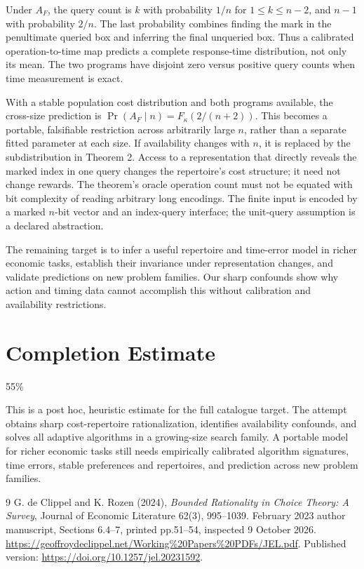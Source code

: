 \documentclass[11pt]{article}
\theoremstyle{remark}
\begin{document}
Under $A_F$, the query count is $k$ with probability $1/n$ for $1\leq k\leq n-2$, and $n-1$ with probability $2/n$. The last probability combines finding the mark in the penultimate queried box and inferring the final unqueried box. Thus a calibrated operation-to-time map predicts a complete response-time distribution, not only its mean. The two programs have disjoint zero versus positive query counts when time measurement is exact.

With a stable population cost distribution and both programs available, the cross-size prediction is $\Pr(A_F\mid n)=F_\kappa(2/(n+2))$. This becomes a portable, falsifiable restriction across arbitrarily large $n$, rather than a separate fitted parameter at each size. If availability changes with $n$, it is replaced by the subdistribution in Theorem 2. Access to a representation that directly reveals the marked index in one query changes the repertoire's cost structure; it need not change rewards. The theorem's oracle operation count must not be equated with bit complexity of reading arbitrary long encodings. The finite input is encoded by a marked $n$-bit vector and an index-query interface; the unit-query assumption is a declared abstraction.

The remaining target is to infer a useful repertoire and time-error model in richer economic tasks, establish their invariance under representation changes, and validate predictions on new problem families. Our sharp confounds show why action and timing data cannot accomplish this without calibration and availability restrictions.

\section{Completion Estimate}
55\%

This is a post hoc, heuristic estimate for the full catalogue target.
The attempt obtains sharp cost-repertoire rationalization, identifies availability confounds, and solves all adaptive algorithms in a growing-size search family. A portable model for richer economic tasks still needs empirically calibrated algorithm signatures, time errors, stable preferences and repertoires, and prediction across new problem families.

\begin{thebibliography}{9}
 G. de Clippel and K. Rozen (2024), \emph{Bounded Rationality in Choice Theory: A Survey}, Journal of Economic Literature 62(3), 995--1039. February 2023 author manuscript, Sections 6.4--7, printed pp.51--54, inspected 9 October 2026. \url{https://geoffroydeclippel.net/Working%20Papers%20PDFs/JEL.pdf}. Published version: \url{https://doi.org/10.1257/jel.20231592}.
\end{thebibliography}
\end{document}
